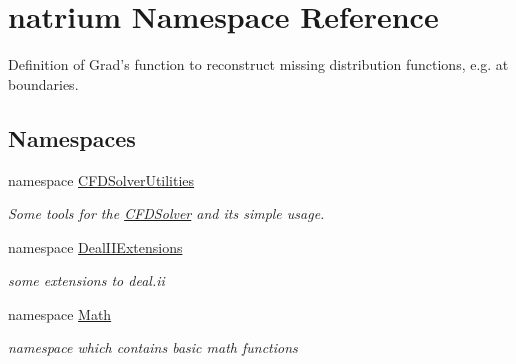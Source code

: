 \hypertarget{namespacenatrium}{
\section{natrium Namespace Reference}
\label{namespacenatrium}
}


Definition of Grad's function to reconstruct missing distribution functions, e.g. at boundaries.  
\subsection*{Namespaces}
\begin{DoxyCompactItemize}
\item 
namespace \hyperlink{namespacenatrium_1_1CFDSolverUtilities}{CFDSolverUtilities}


\begin{DoxyCompactList}\small\item\em Some tools for the \hyperlink{classnatrium_1_1CFDSolver}{CFDSolver} and its simple usage. \item\end{DoxyCompactList}\item 
namespace \hyperlink{namespacenatrium_1_1DealIIExtensions}{DealIIExtensions}


\begin{DoxyCompactList}\small\item\em some extensions to deal.ii \item\end{DoxyCompactList}\item 
namespace \hyperlink{namespacenatrium_1_1Math}{Math}


\begin{DoxyCompactList}\small\item\em namespace which contains basic math functions \item\end{DoxyCompactList}\end{DoxyCompactItemize}
